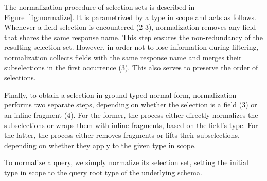 The normalization procedure of selection sets is described in
Figure~\ref{fig:normalize}. It is parametrized by a type in scope and
acts as follows. Whenever a field selection is encountered (2-3),
normalization removes any field that shares the same response
name. This step ensures the non-redundancy of the resulting selection
set.  However, in order not to lose information during filtering,
normalization collects fields with the same response name and merges
their subselections in the first occurrence (3). This also serves to
preserve the order of selections.

Finally, to obtain a selection in ground-typed normal form,
normalization performs two separate steps, depending on whether the
selection is a field (3) or an inline fragment (4). For the former,
the process either directly normalizes the subselections or wraps them
with inline fragments, based on the field's type.  For the latter, the
process either removes fragments or lifts their subselections,
depending on whether they apply to the given type in scope.

To normalize a query, we simply normalize its selection set, setting
the initial type in scope to the  query root type of the underlying
schema.

